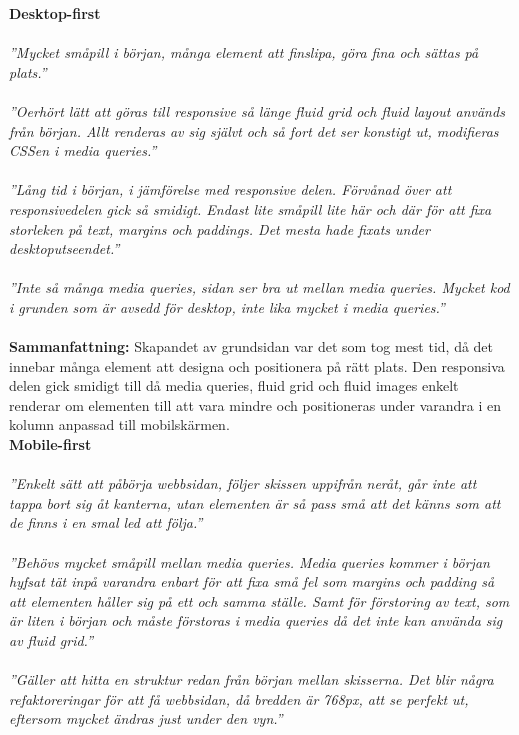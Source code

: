 \documentclass[11pt]{article}
\begin{document}
\textbf{Desktop-first}
\\\\
\textit{”Mycket småpill i början, många element att finslipa, göra fina och sättas på plats.”}\\\\
\textit{”Oerhört lätt att göras till responsive så länge fluid grid och fluid layout används från början. Allt renderas av sig självt och så fort det ser konstigt ut, modifieras CSSen i media queries.”}\\\\
\textit{”Lång tid i början, i jämförelse med responsive delen. Förvånad över att responsivedelen gick så smidigt. Endast lite småpill lite här och där för att fixa storleken på text, margins och paddings. Det mesta hade fixats under desktoputseendet.”}\\\\
\textit{”Inte så många media queries, sidan ser bra ut mellan media queries. Mycket kod i grunden som är avsedd för desktop, inte lika mycket i media queries.”}\\\\
\textbf{Sammanfattning:} Skapandet av grundsidan var det som tog mest tid, då det innebar många element att designa och positionera på rätt plats. Den responsiva delen gick smidigt till då media queries, fluid grid och fluid images enkelt renderar om elementen till att vara mindre och positioneras under varandra i en kolumn anpassad till mobilskärmen.
\vspace{0.735cm}
\\
\textbf{Mobile-first}
\\\\
\textit{”Enkelt sätt att påbörja webbsidan, följer skissen uppifrån neråt, går inte att tappa bort sig åt kanterna, utan elementen är så pass små att det känns som att de finns i en smal led att följa.”}\\\\
\textit{”Behövs mycket småpill mellan media queries. Media queries kommer i början hyfsat tät inpå varandra enbart för att fixa små fel som margins och padding så att elementen håller sig på ett och samma ställe. Samt för förstoring av text, som är liten i början och måste förstoras i media queries då det inte kan använda sig av fluid grid.”}\\\\
\textit{”Gäller att hitta en struktur redan från början mellan skisserna. Det blir några refaktoreringar för att få webbsidan, då bredden är 768px, att se perfekt ut, eftersom mycket ändras just under den vyn.”}\\\\
\end{document}

